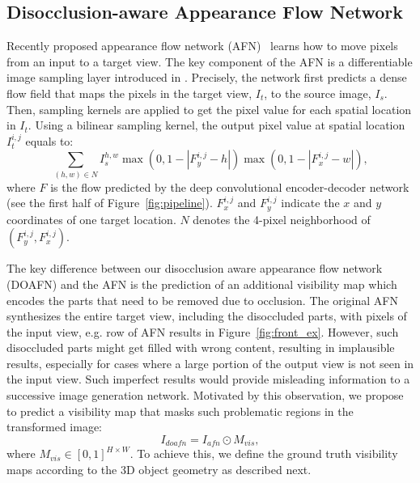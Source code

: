 \documentclass[10pt,twocolumn,letterpaper]{article}
\begin{document}
\subsection{Disocclusion-aware Appearance Flow Network}
\label{sec:doafn}
%
Recently proposed appearance flow network (AFN)~\cite{Zhou_eccv2016} learns how to move pixels from an input to a target view. The key component of the AFN is a differentiable image sampling layer introduced in \cite{jaderberg_NIPS2015}. Precisely, the network first predicts a dense flow field that maps the pixels in the target view, $I_t$, to the source image, $I_s$. Then, sampling kernels are applied to get the pixel value for each spatial location in $I_t$. Using a bilinear sampling kernel, the output pixel value at spatial location $I_t^{i,j}$ equals to:
\begin{equation}
\sum_{(h,w) \in N} I_s^{h,w} \max(0,1-|F_y^{i,j}-h|) \max(0,1-|F_x^{i,j}-w|),
\end{equation}
where $F$ is the flow predicted by the deep convolutional encoder-decoder network (see the first half of Figure~\ref{fig:pipeline}). $F_x^{i,j}$ and $F_y^{i,j}$ indicate the $x$ and $y$ coordinates of one target location. $N$ denotes the 4-pixel neighborhood of $(F_y^{i,j},F_x^{i,j})$. 

The key difference between our disocclusion aware appearance flow network (DOAFN) and the AFN is the prediction of an additional visibility map which encodes the parts that need to be removed due to occlusion. The original AFN synthesizes the entire target view, including the disoccluded parts, with pixels of the input view, e.g.  row of AFN results in Figure~\ref{fig:front_ex}. However, such disoccluded parts might get filled with wrong content, resulting in implausible results, especially for cases where a large portion of the output view is not seen in the input view. Such imperfect results would provide misleading information to a successive image generation network. Motivated by this observation, we propose to predict a visibility map that masks such problematic regions in the transformed image:
\begin{equation}
I_{doafn} = I_{afn} \odot M_{vis},
\end{equation}
where $M_{vis} \in [0,1]^{H \times W}$. 
To achieve this, we define the ground truth visibility maps according to the 3D object geometry as described next.
\end{document}
